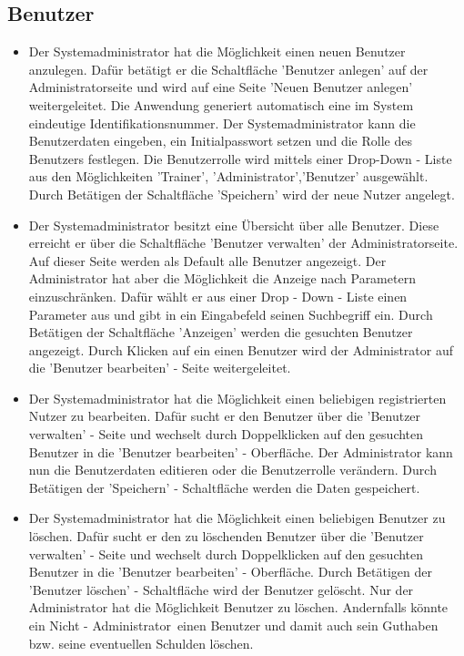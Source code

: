 \documentclass[a4paper]{scrreprt}
\begin{document}
\subsection{Benutzer}
\begin{itemize}
	\item {}
	Der Systemadministrator hat die Möglichkeit einen neuen Benutzer anzulegen. Dafür betätigt er die Schaltfläche 'Benutzer anlegen' auf der Administratorseite und wird auf eine Seite 'Neuen Benutzer anlegen' weitergeleitet. 
	Die Anwendung generiert automatisch eine im System eindeutige Identifikationsnummer. Der Systemadministrator kann die Benutzerdaten eingeben, ein Initialpasswort setzen und die Rolle des Benutzers festlegen. Die Benutzerrolle wird mittels einer Drop-Down - Liste aus den Möglichkeiten 'Trainer', 'Administrator','Benutzer' ausgewählt. Durch Betätigen der Schaltfläche 'Speichern' wird der neue Nutzer angelegt.
	\item {}
	Der Systemadministrator besitzt eine Übersicht über alle Benutzer. Diese erreicht er über die Schaltfläche 'Benutzer verwalten' der Administratorseite. Auf dieser Seite werden als Default alle Benutzer angezeigt. Der Administrator hat aber die Möglichkeit die Anzeige nach Parametern einzuschränken. Dafür wählt er aus einer Drop - Down - Liste einen Parameter aus und gibt in ein Eingabefeld seinen Suchbegriff ein. Durch Betätigen der Schaltfläche 'Anzeigen' werden die gesuchten Benutzer angezeigt. Durch Klicken auf ein einen Benutzer wird der Administrator auf die 'Benutzer bearbeiten' - Seite weitergeleitet.
	\item {}
	Der Systemadministrator hat die Möglichkeit einen beliebigen registrierten Nutzer zu bearbeiten. Dafür sucht er den Benutzer über die 'Benutzer verwalten' - Seite und wechselt durch Doppelklicken auf den gesuchten Benutzer in die 'Benutzer bearbeiten' - Oberfläche. Der Administrator kann nun die Benutzerdaten editieren oder die Benutzerrolle verändern. Durch Betätigen der 'Speichern' - Schaltfläche werden die Daten gespeichert.
	\item {}
	Der Systemadministrator hat die Möglichkeit einen beliebigen Benutzer zu löschen. Dafür sucht er den zu löschenden Benutzer über die 'Benutzer verwalten' - Seite und wechselt durch Doppelklicken auf den gesuchten Benutzer in die 'Benutzer bearbeiten' - Oberfläche. Durch Betätigen der 'Benutzer löschen' - Schaltfläche wird der Benutzer gelöscht. Nur der Administrator hat die Möglichkeit Benutzer zu löschen. Andernfalls könnte ein \glqq Nicht - Administrator\grqq \ einen Benutzer und damit auch sein Guthaben bzw. seine eventuellen Schulden löschen.

\end{itemize}
\end{document}
